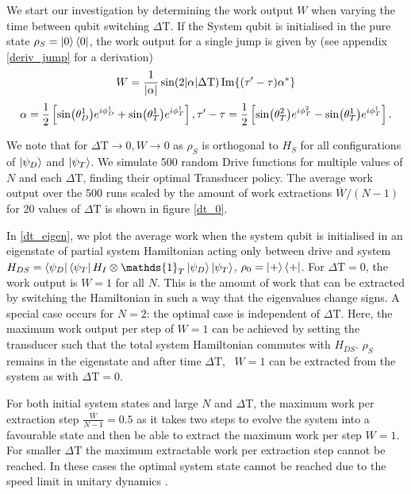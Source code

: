 We start our investigation by determining the work output $W$ when varying the time between qubit switching $\Delta \mathrm{T}$.
If the System qubit is initialised in the pure state $\rho_S = \ket{0} \bra{0}$, the work output for a single jump is given by (see appendix \ref{deriv_jump} for a derivation)
\begin{equation} \label{single_work}
	W = \frac{1}{\abs{\alpha}} \sin(2\abs{\alpha}\Delta \mathrm{T}) \Im{(\tau' - \tau) \alpha^*}
\end{equation}
\begin{equation*}
	\alpha = \frac{1}{2} \left[\sin(\theta_D^1) e^{i\phi_D^1} + \sin(\theta_T^1) e^{i\phi_T^1}\right], \\
	\tau' - \tau = \frac{1}{2} \left[ \sin(\theta_T^2)e^{i\phi_T^2} - \sin(\theta_T^1)e^{i\phi_T^1} \right].
\end{equation*}

We note that for $\Delta \mathrm{T} \to 0, W \to 0$ as $\rho_S$ is orthogonal to $H_S $ for all configurations of $\ket{\psi_D}$ and $ \ket{\psi_T}$.
We simulate 500 random Drive functions for multiple values of $N$ and each $\Delta \mathrm{T}$, finding their optimal Transducer policy. The average work output over the 500 runs scaled by the amount of work extractions $\overline{W}/(N-1)$ for 20 values of $\Delta \mathrm{T}$ is shown in figure \ref{dt_0}.

In \ref{dt_eigen}, we plot the average work when the system qubit is initialised in an eigenstate of partial system Hamiltonian acting only between drive and system $H_{DS} = \bra{\psi_D}\bra{\psi_T} H_I \otimes \mathds{1}_T \ket{\psi_D} \ket{\psi_T}$, $\rho_0 = \ket{+}\bra{+}$.
For $\Delta \mathrm{T} = 0$, the work output is $W = 1$ for all $N$. This is the amount of work that can be extracted by switching the Hamiltonian in such a way that the eigenvalues change signs.
A special case occurs for $N = 2$: the optimal case is independent of $\Delta \mathrm{T}$.
Here, the maximum work output per step of $W = 1$ can be achieved by setting the transducer such that the total system Hamiltonian commutes with $H_{DS}$. $\rho_S$ remains in the eigenstate and after time $\Delta \mathrm{T}$, \ $W = 1$ can be extracted from the system as with $\Delta \mathrm{T} = 0$.

For both initial system states and large $N$ and $\Delta \mathrm{T}$, the maximum work per extraction step $\frac{\overline{W}}{N-1} = 0.5$ as it takes two steps to evolve the system into a favourable state and then be able to extract the maximum work per step $W = 1$.
For smaller $\Delta \mathrm{T}$ the maximum extractable work per extraction step cannot be reached. In these cases the optimal system state cannot be reached due to the speed limit in unitary dynamics \cite{Deffner_2017, PhysRevA.67.052109}.


